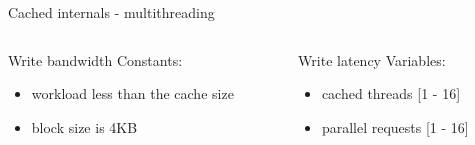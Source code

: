 \begin{frame}{Cached internals - multithreading}
	\begin{columns}[t]
		\begin{column}{.5\textwidth}
			Write bandwidth
			Constants:
			\begin{itemize}
				\item workload less than the cache size
				\item block size is 4KB
			\end{itemize}
		\end{column}
		\begin{column}{.5\textwidth}
			Write latency
			Variables:
			\begin{itemize}
				\item cached threads [1 - 16]
				\item parallel requests [1 - 16]
			\end{itemize}
		\end{column}
	\end{columns}

\end{frame}


